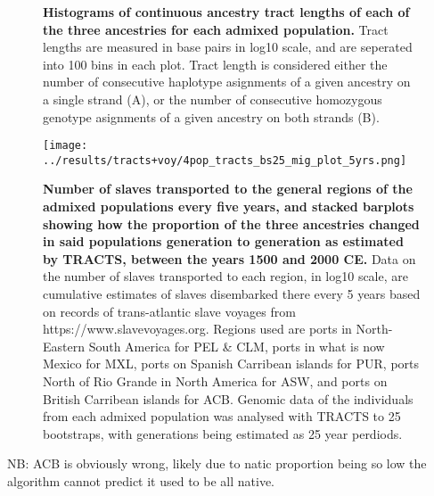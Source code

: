 \documentclass[11pt]{article}
\begin{document}
\begin{figure}[htb!]%
    \centering
    \vspace*{-1em}
    \vspace{.2cm}
    \caption{\textbf{
        Histograms of continuous ancestry tract lengths of each of the three ancestries for each admixed population.
    }
        Tract lengths are measured in base pairs in log10 scale, and are seperated into 100 bins in each plot. Tract length is considered either the number of consecutive haplotype asignments of a given ancestry on a single strand (A), or the number of consecutive homozygous genotype asignments of a given ancestry on both strands (B).
    }
\end{figure}



\begin{figure}[htb!]%
    \centering
    \texttt{[image: 
        ../results/tracts+voy/4pop\_tracts\_bs25\_mig\_plot\_5yrs.png]}
    \vspace{-.2cm}
    \caption{\textbf{
        Number of slaves transported to the general regions of the admixed populations every five years, and stacked barplots showing how the proportion of the three ancestries changed in said populations generation to generation as estimated by TRACTS, between the years 1500 and 2000 CE.
    }
        Data on the number of slaves transported to each region, in log10 scale, are cumulative estimates of slaves disembarked there every 5 years based on records of trans-atlantic slave voyages from https://www.slavevoyages.org. Regions used are ports in North-Eastern South America for PEL \& CLM, ports in what is now Mexico for MXL, ports on Spanish Carribean islands for PUR, ports North of Rio Grande in North America for ASW, and ports on British Carribean islands for ACB. Genomic data of the individuals from each admixed population was analysed with TRACTS to 25 bootstraps, with generations being estimated as 25 year perdiods.
    }
\end{figure}


NB: ACB is obviously wrong, likely due to natic proportion being so low the algorithm cannot predict it used to be all native.
\end{document}
